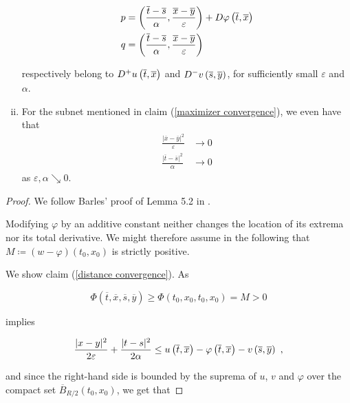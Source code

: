 \begin{lemma}
\begin{enumerate}[(i)]
		 		\begin{align*}
		 			p &= \left( \frac{\overline{t} - \overline{s}}{\alpha}, \frac{\overline{x} - \overline{y}}{\varepsilon} \right) + D\varphi\left(\overline{t}, \overline{x}\right) \\
		 			q &= \left( \frac{\overline{t} - \overline{s}}{\alpha}, \frac{\overline{x} - \overline{y}}{\varepsilon} \right)
		 		\end{align*}
		 		
		 		respectively belong to $ D^{+}u\left(\overline{t}, \overline{x}\right) $ and $ D^{-}v\left(\overline{s}, \overline{y}\right) $, for sufficiently small $ \varepsilon $ and $ \alpha $.
		 		
		 		\item
		 		\label{fast convergence}
		 		For the subnet mentioned in claim (\ref{maximizer convergence}), we even have that
		 		\begin{align*}
		 			\frac{\lvert \overline{x} - \overline{y} \rvert^2}{\varepsilon} &\to 0 \\
		 			\frac{\lvert \overline{t} - \overline{s} \rvert^2}{\alpha} &\to 0 
		 		\end{align*} 
		 		as $ \varepsilon, \alpha \searrow 0 $.
		 	\end{enumerate}
	 	
	 	\begin{proof}
	 		We follow Barles' proof of Lemma 5.2 in \cite[p.~69]{barles}.
	 		
	 	 Modifying $ \varphi $ by an additive constant neither changes the location of its extrema nor its total derivative. We might therefore assume in the following that $ M \coloneqq (w - \varphi)(t_0, x_0)  $ is strictly positive.
	 		
	 		We show claim (\ref{distance convergence}). As
	 		
	 		\begin{equation}
	 			\label{larger maximum}
	 			\Phi(\overline{t}, \overline{x}, \overline{s}, \overline{y}) \geq \Phi(t_0, x_0, t_0, x_0) = M > 0
	 		\end{equation}
	 		
	 		implies
	 		
	 		\begin{equation*}
	 			\frac{\lvert x - y \rvert^2 }{2 \varepsilon} + \frac{\lvert t - s \rvert^2}{2 \alpha} \leq u\left(\overline{t}, \overline{x}\right) - \varphi\left(\overline{t}, \overline{x}\right) - v\left(\overline{s}, \overline{y}\right) \ ,
	 		\end{equation*}
	 		
	 		and since the right-hand side is bounded by the suprema of $ u $, $ v $ and $ \varphi $ over the compact set $ \overline{B}_{R / 2}(t_0, x_0) $, we get that
	 		

\end{proof}
\end{lemma}
